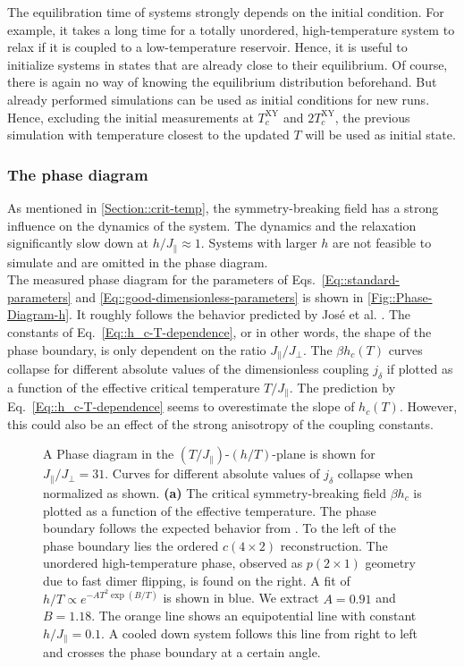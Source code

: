	The equilibration time of systems strongly depends on the initial condition. For example, it takes a long time for a totally unordered, high-temperature system to relax if it is coupled to a low-temperature reservoir. Hence, it is useful to initialize systems in states that are already close to their equilibrium. Of course, there is again no way of knowing the equilibrium distribution beforehand. But already performed simulations can be used as initial conditions for new runs. Hence, excluding the initial measurements at $T_c^{\text{XY}}$ and $2T_c^{\text{XY}}$, the previous simulation with temperature closest to the updated $T$ will be used as initial state.
	\subsubsection{The phase diagram}
	As mentioned in \autoref{Section::crit-temp}, the symmetry-breaking field has a strong influence on the dynamics of the system. The dynamics and the relaxation significantly slow down at $ h / J_\parallel \approx 1$. Systems with larger $h$ are not feasible to simulate and are omitted in the phase diagram. \\
	
	The measured phase diagram for the parameters of Eqs.~\eqref{Eq::standard-parameters} and \eqref{Eq::good-dimensionless-parameters} is shown in \autoref{Fig::Phase-Diagram-h}. It roughly follows the behavior predicted by José et al. \cite{jose1977renormalization}. The constants of Eq.~\eqref{Eq::h_c-T-dependence}, or in other words, the shape of the phase boundary, is only dependent on the ratio $J_\parallel /	J_\perp$. The $\beta h_c(T)$ curves collapse for different absolute values of the dimensionless coupling $j_\delta$ if plotted as a function of the effective critical temperature $T/J_\parallel$. The prediction by Eq.~\eqref{Eq::h_c-T-dependence} seems to overestimate the slope of $h_c(T)$. However, this could also be an effect of the strong anisotropy of the coupling constants.	
	\begin{figure}[htp]
		\centering
		
		\caption{A Phase diagram in the $({T}/{J_\parallel})$-$({h}/{T})$-plane is shown for $J_\parallel /	J_\perp =	31$. Curves for different absolute values of $j_\delta$ collapse when normalized as shown.  \textbf{(a)} The critical symmetry-breaking field $\beta h_c$ is plotted as a function of the effective temperature. The phase boundary follows the expected behavior from \cite{jose1977renormalization}. To the left of the phase boundary lies the ordered $c(4 \times 2)$ reconstruction. The unordered high-temperature phase, observed as $p(2 \times 1)$ geometry due to fast dimer flipping, is found on the right. A fit of ${h}/{T} \propto e^{-AT^2 \exp({B/T})}$ is shown in blue.  We extract $A=0.91$ and $B=1.18$. The orange line shows an equipotential line with constant $h / J_\parallel =	0.1$. A cooled down system follows this line from right to left and crosses the phase boundary at a certain angle.}
		\label{Fig::Phase-Diagram-h}
	\end{figure}
